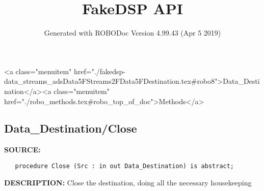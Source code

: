 \documentclass{article}
\title{FakeDSP API}
\author{Generated with ROBODoc Version 4.99.43 (Apr  5 2019)
}
\begin{document}
\maketitle
\printindex
\tableofcontents
\newpage

<a class="menuitem" href="./fakedsp-data_streams_adsData5FStreams2FData5FDestination.tex#robo8">Data_Destination</a><a class="menuitem" href="./robo_methods.tex#robo_top_of_doc">Methods</a>\subsection{Data\_Destination/Close}
\textbf{SOURCE:}\hspace{0.08in}\begin{verbatim}
   procedure Close (Src : in out Data_Destination) is abstract;
\end{verbatim}
\textbf{DESCRIPTION:}\hspace{0.08in}
   Close the destination, doing all the necessary housekeeping
\end{document}
